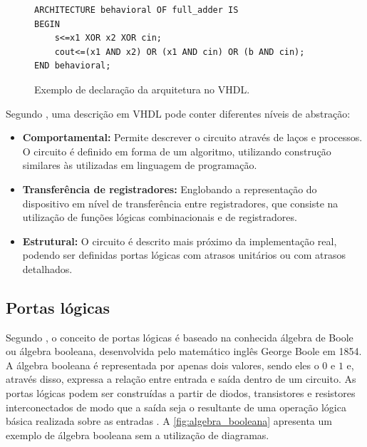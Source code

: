\begin{figure}[H]
\caption{\label{fig:arquitetura} Exemplo de declaração da arquitetura no VHDL.}
	\begin{center}
    \begin{minipage}{0.7\textwidth}
    \begin{lstlisting}       
ARCHITECTURE behavioral OF full_adder IS
BEGIN
	s<=x1 XOR x2 XOR cin;
    cout<=(x1 AND x2) OR (x1 AND cin) OR (b AND cin);
END behavioral;

\end{lstlisting}
    \end{minipage}
	\end{center}
\end{figure}

\par
Segundo , uma descrição em VHDL pode conter diferentes níveis de abstração:
\begin{itemize}
  \item \textbf{Comportamental:} Permite descrever o circuito através de laços e processos. O circuito é definido em forma de um algoritmo, utilizando construção similares às utilizadas em linguagem de programação.
  
  \item \textbf{Transferência de registradores:} Englobando a representação do dispositivo em nível de transferência entre registradores, que consiste na utilização de funções lógicas combinacionais e de registradores.
  
  \item \textbf{Estrutural:} O circuito é descrito mais próximo da implementação real, podendo ser definidas portas lógicas com atrasos unitários ou com atrasos detalhados.
\end{itemize}

\subsection{Portas lógicas}

Segundo , o conceito de portas lógicas é baseado na conhecida álgebra de Boole ou álgebra booleana, desenvolvida pelo matemático inglês George Boole em 1854. A álgebra booleana é representada por apenas dois valores, sendo eles o $0$ e $1$ e, através disso, expressa a relação entre entrada e saída dentro de um circuito. As portas lógicas podem ser construídas a partir de diodos, transistores e resistores interconectados de modo que a saída seja o resultante de uma operação lógica básica realizada sobre as entradas \cite{tocci2003sistemas}. A \autoref{fig:algebra_booleana} apresenta um exemplo de álgebra booleana sem a utilização de diagramas.

